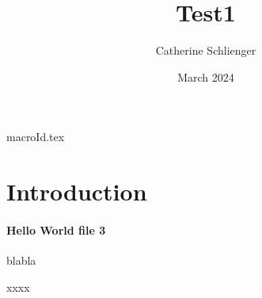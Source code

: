 \documentclass{article}
\title{Test1}
\author{Catherine Schlienger}
\date{March 2024}
\begin{document}
{macroId.tex}

\maketitle

\section{Introduction}
\paragraph{Hello World file 3}

blabla

xxxx
\GESCHICHTEDERPHILOSOPHIE{}
\end{document}
